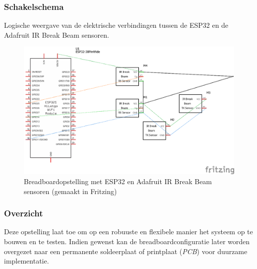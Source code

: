 \subsubsection{Schakelschema}
Logische weergave van de elektrische verbindingen tussen de ESP32 en de Adafruit IR Break Beam sensoren.


\begin{figure}[htbp]
    \centering
    \includegraphics[width=\textwidth]{img/bp/wachtruimtes/technische_uitwerking/schakelschema.png}
    \caption{Breadboardopstelling met ESP32 en Adafruit IR Break Beam sensoren (gemaakt in Fritzing)}
    \label{fig:schakelschema}
\end{figure}


\subsubsection{Overzicht}
Deze opstelling laat toe om op een robuuste en flexibele manier het systeem op te bouwen en te testen. Indien gewenst kan de breadboardconfiguratie later worden overgezet naar een permanente soldeerplaat of printplaat (\textit{PCB}) voor duurzame implementatie.


